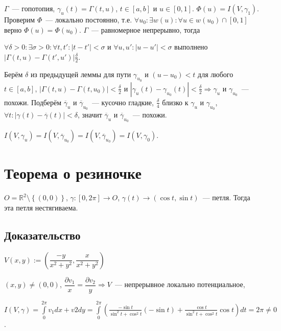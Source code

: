 \documentclass{article}
\begin{document}
            $\Gamma$~--- гопотопия, $\gamma_u(t) = \Gamma(t, u)$, $t \in [a, b]$ и $u \in [0, 1]$. $\Phi(u) = I(V, \gamma_1)$. Проверим $\Phi$~--- локально постоянно, т.е. $\forall u_0 : \exists w(u) : \forall u \in w(u_0) \cap [0, 1]$ верно $\Phi(u) = \Phi(u_0)$. $\Gamma$~--- равномерное непрерывно, тогда
            
            $\forall \delta > 0 : \exists \sigma > 0 : \forall t, t' : | t - t' | < \sigma$ и $\forall u, u' : | u - u' | < \sigma$ выполнено $\left| \Gamma(t, u) - \Gamma(t', u') \right|  \frac{\delta}{2}$.
            
            Берём $\delta$ из предыдущей леммы для пути $\gamma_{u_0}$ и $(u - u_0) < t$ для любого $t \in [a, b]$, $\left| \Gamma(t, u) - \Gamma(t, u_0) \right| < \frac{\delta}{2}$ и $\left| \gamma_u(t) - \gamma_{u_0}(t) \right| < \frac{\delta}{2} \Rightarrow \gamma_u$ и $\gamma_{u_0}$~--- похожи. Подберём $\overline{\gamma}_u$ и $\overline{\gamma}_{u_0}$~--- кусочно гладкие, $\frac{\delta}{4}$ близко к $\gamma_u$ и $\gamma_{u_0}$, $\forall t : | \gamma(t) - \overline{\gamma}(t) | < \delta$, значит $\overline{\gamma}_u$ и $\overline{\gamma}_{u_0}$~--- похожи.
            
            $I(V, \gamma_u) = I(V, \overline{\gamma}_{u_0}) = I(V, \overline{\gamma}_{u_0}) = I(V, \gamma_0)$.
    
    \newpage
    
    \section{Теорема о  резиночке}
    
        $O = \mathbb{R}^2 \setminus \left\{ (0, 0) \right\}$, $\gamma : [0, 2 \pi] \rightarrow O$, $\gamma(t) \rightarrow (\cos{t}, \sin{t})$~--- петля. Тогда эта петля нестягиваема.
        
        \subsection{Доказательство}
        
            $V(x, y) := \left( \dfrac{-y}{x^2 + y^2}, \dfrac{x}{x^2 + y^2} \right)$ 
            
            $(x, y) \neq (0, 0)$, $\dfrac{\partial v_1}{x} = \dfrac{\partial v_2}{y} \Rightarrow V$~--- непрерывное локально потенциальное,
            
            $I(V, \gamma) = \int\limits^{2 \pi}_0 v_1 dx + v2 dy = \int\limits^{2 \pi}_0 \left( \frac{-\sin t}{\sin^2 t + \cos^2 t} (-\sin t) + \frac{\cos t}{\sin^2 t + \cos^2 t} \cos t \right) dt = 2 \pi \neq 0$.
            
\end{document}

